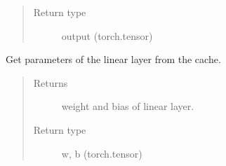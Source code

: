 \documentclass[letterpaper,10pt,english]{sphinxmanual}
\begin{document}
\begin{fulllineitems}
\begin{fulllineitems}
\begin{quote}
\begin{description}
\item[{Return type}] \leavevmode
output (torch.tensor)

\end{description}\end{quote}

\end{fulllineitems}


\begin{fulllineitems}
\label{\detokenize{nn:nn.linear.Linear.param}}
Get parameters of the linear layer from the cache.
\begin{quote}\begin{description}
\item[{Returns}] \leavevmode
weight and bias of linear layer.

\item[{Return type}] \leavevmode
w, b (torch.tensor)

\end{description}\end{quote}

\end{fulllineitems}


\end{fulllineitems}

\end{document}
